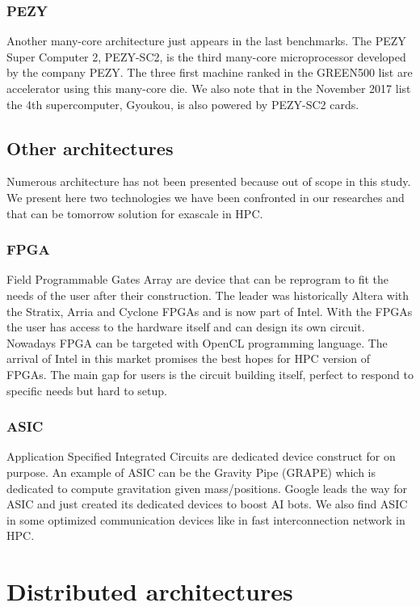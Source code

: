 \subsubsection{PEZY}
Another many-core architecture just appears in the last benchmarks. 
The PEZY Super Computer 2, PEZY-SC2, is the third many-core microprocessor developed by the company PEZY. 
The three first machine ranked in the GREEN500 list are accelerator using this many-core die. 
We also note that in the November 2017 list the 4th supercomputer, Gyoukou, is also powered by PEZY-SC2 cards.

\subsection{Other architectures}
Numerous architecture has not been presented because out of scope in this study. 
We present here two technologies we have been confronted in our researches and that can be tomorrow solution for exascale in HPC. 
\subsubsection{FPGA}
Field Programmable Gates Array are device that can be reprogram to fit the needs of the user after their construction.
The leader was historically Altera with the Stratix, Arria and Cyclone FPGAs and is now part of Intel. 
With the FPGAs the user has access to the hardware itself and can design its own circuit. 
Nowadays FPGA can be targeted with OpenCL programming language. 
The arrival of Intel in this market promises the best hopes for HPC version of FPGAs. 
The main gap for users is the circuit building itself, perfect to respond to specific needs but hard to setup. 
\subsubsection{ASIC}
Application Specified Integrated Circuits are dedicated device construct for on purpose. 
An example of ASIC can be the Gravity Pipe (GRAPE) which is dedicated to compute gravitation given mass/positions.
Google leads the way for ASIC and just created its dedicated devices to boost AI bots.
We also find ASIC in some optimized communication devices like in fast interconnection network in HPC.  

\section{Distributed architectures}

